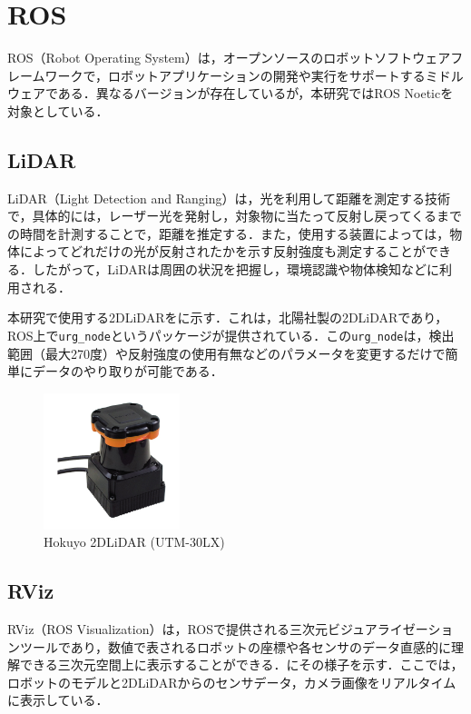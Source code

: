
\section{ROS}

ROS（Robot Operating System）は，オープンソースのロボットソフトウェアフレームワークで，ロボットアプリケーションの開発や実行をサポートするミドルウェアである．異なるバージョンが存在しているが，本研究ではROS Noeticを対象としている．

\subsection{LiDAR}

  LiDAR（Light Detection and Ranging）は，光を利用して距離を測定する技術で，具体的には，レーザー光を発射し，対象物に当たって反射し戻ってくるまでの時間を計測することで，距離を推定する．また，使用する装置によっては，物体によってどれだけの光が反射されたかを示す反射強度も測定することができる．したがって，LiDARは周囲の状況を把握し，環境認識や物体検知などに利用される．

  本研究で使用する2DLiDARをに示す．これは，北陽社製の2DLiDARであり，ROS上で\texttt{urg\_node}\cite{urg_node}というパッケージが提供されている．この\texttt{urg\_node}は，検出範囲（最大270度）や反射強度の使用有無などのパラメータを変更するだけで簡単にデータのやり取りが可能である．

  \begin{figure}[h]
    \centering
    \includegraphics[keepaspectratio, scale=0.80] {images/RobotGuidance_hokuyo_lidar.png}
    \caption{Hokuyo 2DLiDAR (UTM-30LX) \cite{hokuyo}}
    \label{Fig:hokuyo_lidar}
  \end{figure}

\newpage

\subsection{RViz}

  RViz（ROS Visualization）\cite{rviz}は，ROSで提供される三次元ビジュアライゼーションツールであり，数値で表されるロボットの座標や各センサのデータ直感的に理解できる三次元空間上に表示することができる．にその様子を示す．ここでは，ロボットのモデルと2DLiDARからのセンサデータ，カメラ画像をリアルタイムに表示している．

